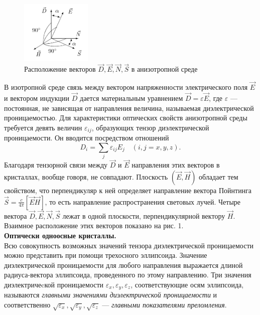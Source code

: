 \documentclass[a4paper, 12pt]{article}%
\begin{document}
	
	
	
	\begin{figure}[H]
		\begin{center}
			\includegraphics[width=0.3\textwidth]{DENS.png}
			\caption{Расположение векторов $\vec D, \vec E, \vec N, \vec S$ в анизотропной среде}
			\label{t}
		\end{center}
	\end{figure}
	
	В изотропной среде связь между вектором напряженности электрического поля $\vec E$ и вектором индукции $\vec D$ дается материальным уравнением $\vec D = \varepsilon \vec E$, где $\varepsilon$ --- постоянная, не зависящая от направления величина, называемая диэлектрической проницаемостью. Для характеристики оптических свойств анизотропной среды требуется девять величин $\varepsilon_{i j}$, образующих тензор диэлектрической проницаемости. Он вводится посредством отношений
	\begin{equation}
		D_i = \sum_j \varepsilon_{i j} E_j \quad (i, j = x, y, z).
	\end{equation}
	Благодаря тензорной связи между $\vec D$ и $\vec E$ направления этих векторов в кристаллах, вообще говоря, не совпадают. Плоскость $\left( \vec E, \vec H \right)$ обладает тем свойством, что перпендикуляр к ней определяет направление вектора Пойнтинга $\vec S = \frac{c}{4 \pi} \left[\vec E \vec H \right]$, то есть направление распространения световых лучей. Четыре вектора $\vec D, \vec E, \vec N, \vec S$ лежат в одной плоскости, перпендикулярной вектору $\vec H$. Взаимное расположение этих векторов показано на рис. 1.\\
	
	\noindent \textbf{Оптически одноосные кристаллы.} \\
	Всю совокупность возможных значений тензора диэлектрической проницаемости можно представить при помощи трехосного эллипсоида. Значение диэлектрической проницаемости для любого направления выражается длиной радиуса-вектора эллипсоида, проведенного по этому направлению. Три значения диэлектричеcкой проницаемости $\varepsilon_x, \varepsilon_y, \varepsilon_z$, соответствующие осям эллипсоида, называются \textit{главными значениями диэлектрической проницаемости} и соответственно $\sqrt{\varepsilon_x}, \sqrt{\varepsilon_y}, \sqrt{\varepsilon_z}$ --- \textit{главными показателями преломления}.
	
\end{document}
